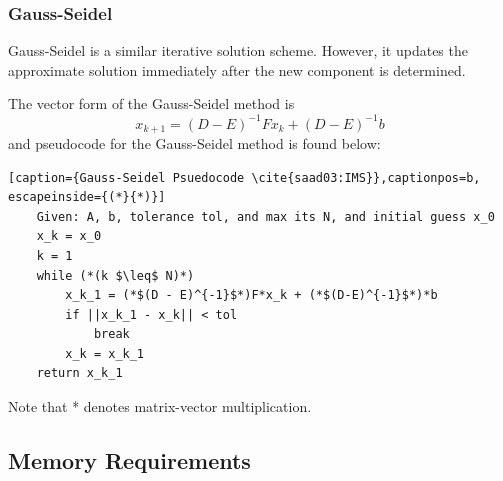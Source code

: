 




\subsubsection{Gauss-Seidel}

Gauss-Seidel is a similar iterative solution scheme. However, it updates the approximate solution immediately after the new component is determined. %

The vector form of the Gauss-Seidel method is
$$
    x_{k+1} = (D - E)^{-1}Fx_k + (D-E)^{-1}b
$$
and pseudocode for the Gauss-Seidel method is found below:

\begin{lstlisting}[caption={Gauss-Seidel Psuedocode \cite{saad03:IMS}},captionpos=b, escapeinside={(*}{*)}]
    Given: A, b, tolerance tol, and max its N, and initial guess x_0
    x_k = x_0
    k = 1
    while (*(k $\leq$ N)*)
        x_k_1 = (*$(D - E)^{-1}$*)F*x_k + (*$(D-E)^{-1}$*)*b
        if ||x_k_1 - x_k|| < tol
            break
        x_k = x_k_1
    return x_k_1
\end{lstlisting}

Note that * denotes matrix-vector multiplication.



\subsection{Memory Requirements}

